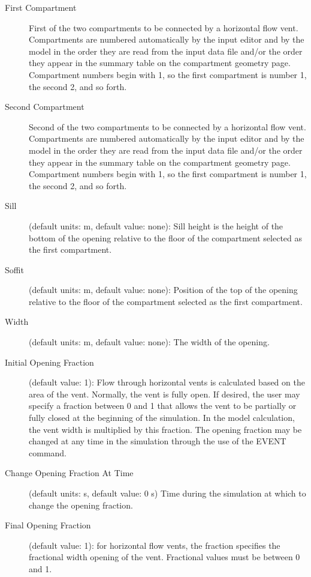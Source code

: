 \begin{description}
\item[First Compartment] First of the two compartments to be connected by a horizontal flow vent.  Compartments are numbered automatically by the input editor and by the model in the order they are read from the input data file and/or the order they appear in the summary table on the compartment geometry page. Compartment numbers begin with 1, so the first compartment is number 1, the second 2, and so forth.

\item[Second Compartment] Second of the two compartments to be connected by a horizontal flow vent.  Compartments are numbered automatically by the input editor and by the model in the order they are read from the input data file and/or the order they appear in the summary table on the compartment geometry page. Compartment numbers begin with 1, so the first compartment is number 1, the second 2, and so forth.

\item[Sill] (default units: m, default value: none): Sill height is the height of the bottom of the opening relative to the floor of the compartment selected as the first compartment.

\item[Soffit] (default units: m, default value: none): Position of the top of the opening relative to the floor of the compartment selected as the first compartment.

\item[Width] (default units: m, default value: none): The width of the opening.

\item[Initial Opening Fraction] (default value: 1): Flow through horizontal vents is calculated based on the area of the vent.  Normally, the vent is fully open.  If desired, the user may specify a fraction between 0 and 1 that allows the vent to be partially or fully closed at the beginning of the simulation.  In the model calculation, the vent width is multiplied by this fraction.  The opening fraction may be changed at any time in the simulation through the use of the EVENT command.

\item[Change Opening Fraction At Time]  (default units: s, default value: 0 s)  Time during the simulation at which to change the opening fraction.

\item[Final Opening Fraction] (default value: 1): for horizontal flow vents, the fraction specifies the fractional width opening of the vent. Fractional values must be between 0 and 1.


\end{description}
